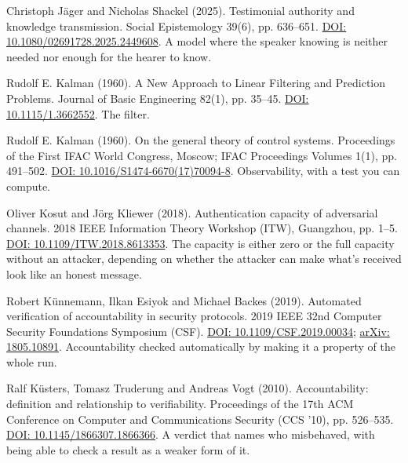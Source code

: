 \noindent Christoph J\"ager and Nicholas Shackel (2025). Testimonial authority and knowledge transmission. Social Epistemology 39(6), pp. 636--651. \href{https://doi.org/10.1080/02691728.2025.2449608}{DOI: 10.1080/02691728.2025.2449608}. A model where the speaker knowing is neither needed nor enough for the hearer to know.
\par\medskip

\noindent Rudolf E. Kalman (1960). A New Approach to Linear Filtering and Prediction Problems. Journal of Basic Engineering 82(1), pp. 35--45. \href{https://doi.org/10.1115/1.3662552}{DOI: 10.1115/1.3662552}. The filter.
\par\medskip

\noindent Rudolf E. Kalman (1960). On the general theory of control systems. Proceedings of the First IFAC World Congress, Moscow; IFAC Proceedings Volumes 1(1), pp. 491--502. \href{https://doi.org/10.1016/S1474-6670(17)70094-8}{DOI: 10.1016/S1474-6670(17)70094-8}. Observability, with a test you can compute.
\par\medskip

\noindent Oliver Kosut and J\"org Kliewer (2018). Authentication capacity of adversarial channels. 2018 IEEE Information Theory Workshop (ITW), Guangzhou, pp. 1--5. \href{https://doi.org/10.1109/ITW.2018.8613353}{DOI: 10.1109/ITW.2018.8613353}. The capacity is either zero or the full capacity without an attacker, depending on whether the attacker can make what's received look like an honest message.
\par\medskip

\noindent Robert K\"unnemann, Ilkan Esiyok and Michael Backes (2019). Automated verification of accountability in security protocols. 2019 IEEE 32nd Computer Security Foundations Symposium (CSF). \href{https://doi.org/10.1109/CSF.2019.00034}{DOI: 10.1109/CSF.2019.00034}; \href{https://arxiv.org/abs/1805.10891}{arXiv: 1805.10891}. Accountability checked automatically by making it a property of the whole run.
\par\medskip

\noindent Ralf K\"usters, Tomasz Truderung and Andreas Vogt (2010). Accountability: definition and relationship to verifiability. Proceedings of the 17th ACM Conference on Computer and Communications Security (CCS '10), pp. 526--535. \href{https://doi.org/10.1145/1866307.1866366}{DOI: 10.1145/1866307.1866366}. A verdict that names who misbehaved, with being able to check a result as a weaker form of it.
\par\medskip

